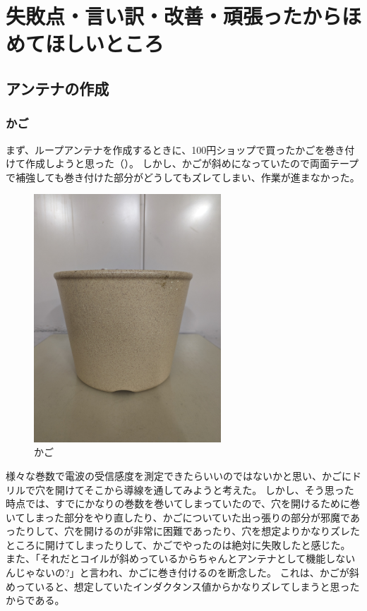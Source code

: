 \documentclass[report.tex]{subfiles}
\begin{document}
\section{失敗点・言い訳・改善・頑張ったからほめてほしいところ} \label{sec:失敗点}

\subsection{アンテナの作成}

\subsubsection{かご}

まず、ループアンテナを作成するときに、100円ショップで買ったかごを巻き付けて作成しようと思った（）。
しかし、かごが斜めになっていたので両面テープで補強しても巻き付けた部分がどうしてもズレてしまい、作業が進まなかった。

\begin{figure}[H]
	\centering
	\includegraphics[width=7cm]{use/kago.jpg}
	\caption{かご}
	\label{fig:kago}
\end{figure}

様々な巻数で電波の受信感度を測定できたらいいのではないかと思い、かごにドリルで穴を開けてそこから導線を通してみようと考えた。
しかし、そう思った時点では、すでにかなりの巻数を巻いてしまっていたので、穴を開けるために巻いてしまった部分をやり直したり、かごについていた出っ張りの部分が邪魔であったりして、穴を開けるのが非常に困難であったり、穴を想定よりかなりズレたところに開けてしまったりして、かごでやったのは絶対に失敗したと感じた。
また、「それだとコイルが斜めっているからちゃんとアンテナとして機能しないんじゃないの?」と言われ、かごに巻き付けるのを断念した。
これは、かごが斜めっていると、想定していたインダクタンス値からかなりズレてしまうと思ったからである。
\end{document}
